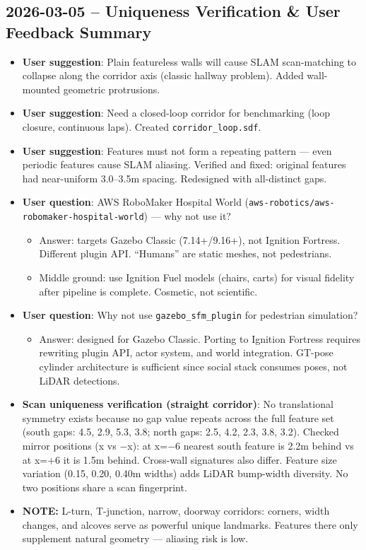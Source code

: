 \documentclass[11pt]{article}
\newcommand{\logentry}[1]{\subsection*{#1}}
\newcommand{\note}[1]{\textcolor{notblue}{\textbf{NOTE:} #1}}
\begin{document}
\logentry{2026-03-05 -- Uniqueness Verification \& User Feedback Summary}
\begin{itemize}
  \item \textbf{User suggestion}: Plain featureless walls will cause SLAM scan-matching to collapse along the corridor axis (classic hallway problem). Added wall-mounted geometric protrusions.
  \item \textbf{User suggestion}: Need a closed-loop corridor for benchmarking (loop closure, continuous laps). Created \texttt{corridor\_loop.sdf}.
  \item \textbf{User suggestion}: Features must not form a repeating pattern --- even periodic features cause SLAM aliasing. Verified and fixed: original features had near-uniform 3.0--3.5m spacing. Redesigned with all-distinct gaps.
  \item \textbf{User question}: AWS RoboMaker Hospital World (\texttt{aws-robotics/aws-robomaker-hospital-world}) --- why not use it?
    \begin{itemize}
      \item Answer: targets Gazebo Classic (7.14+/9.16+), not Ignition Fortress. Different plugin API. ``Humans'' are static meshes, not pedestrians.
      \item Middle ground: use Ignition Fuel models (chairs, carts) for visual fidelity after pipeline is complete. Cosmetic, not scientific.
    \end{itemize}
  \item \textbf{User question}: Why not use \texttt{gazebo\_sfm\_plugin} for pedestrian simulation?
    \begin{itemize}
      \item Answer: designed for Gazebo Classic. Porting to Ignition Fortress requires rewriting plugin API, actor system, and world integration. GT-pose cylinder architecture is sufficient since social stack consumes poses, not LiDAR detections.
    \end{itemize}
  \item \textbf{Scan uniqueness verification (straight corridor)}:
    No translational symmetry exists because no gap value repeats across the full feature set (south gaps: 4.5, 2.9, 5.3, 3.8; north gaps: 2.5, 4.2, 2.3, 3.8, 3.2). Checked mirror positions (x vs $-$x): at x=$-$6 nearest south feature is 2.2m behind vs at x=$+$6 it is 1.5m behind. Cross-wall signatures also differ. Feature size variation (0.15, 0.20, 0.40m widths) adds LiDAR bump-width diversity. No two positions share a scan fingerprint.
  \item \note{L-turn, T-junction, narrow, doorway corridors: corners, width changes, and alcoves serve as powerful unique landmarks. Features there only supplement natural geometry --- aliasing risk is low.}
\end{itemize}
\end{document}
